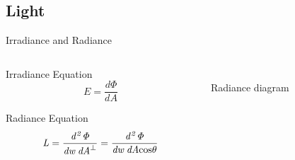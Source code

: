 \documentclass[10pt,compress,professionalfont]{beamer}
\begin{document}
\subsection{Light}
\begin{frame}{Irradiance and Radiance}

    \begin{columns}
        \begin{column}{0.5\textwidth}
                \begin{block}{Irradiance Equation}
                    \[
                    E = \frac{d\Phi}{dA}
                    \]
                \end{block}
            \begin{block}{Radiance Equation}
                \[
                \mathit{L} = \frac{\mathit{d^{2}\Phi}}{\mathit{dw\:dA}^\perp} = \frac{\mathit{d^{2}\Phi}}{\mathit{dw\:dA}\textup{cos}\theta}
                \]
            \end{block}
        \end{column}
        \begin{column}{0.5\textwidth}
            \vspace{-5mm}
            {\centering
            \includegraphics[width=\textwidth]{../img/diag/radiance.pdf}\\
            \scriptsize Radiance diagram\\
            }
        \end{column}
    \end{columns}



\end{frame}
\end{document}
